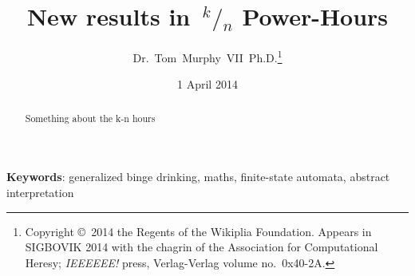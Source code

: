 \documentclass[twocolumn]{article}
\newcommand\sfrac[2]{{}\,^{#1}\!/{}\!_{#2}}
\begin{document}
 

\title{New results in $\sfrac{k}{n}$ Power-Hours}
\author{Dr.~Tom~Murphy~VII~Ph.D.\thanks{
Copyright \copyright\ 2014 the Regents of the Wikiplia
Foundation. Appears in SIGBOVIK 2014 with the chagrin of the
Association for Computational Heresy; {\em IEEEEEE!} press,
Verlag-Verlag volume no.~0x40-2A.
}
}

\renewcommand\th{\ensuremath{{}^{\textrm{th}}}}
\newcommand\st{\ensuremath{{}^{\textrm{st}}}}
\newcommand\rd{\ensuremath{{}^{\textrm{rd}}}}
\newcommand\nd{\ensuremath{{}^{\textrm{nd}}}}
\newcommand\at{\ensuremath{\scriptstyle @}}

\renewcommand\>{$>$}
\newcommand\<{$<$}
\newcommand\kn{\ensuremath{\sfrac{k}{n}\,}}

\newcommand\any{\ensuremath{\textrm{?}}}
\newcommand\nocup{\text{\sout{\ensuremath{\cup}}}}
\newcommand\fullcup{\ensuremath{\uplus}}
\newcommand\emptycup{\ensuremath{\cup}}
\newcommand\overcup{\ensuremath{\cap}}

\newcommand\nodrink{\ensuremath{\Rightarrow}}
\newcommand\drink{\ensuremath{\stackrel{{}^{\textrm{+}}}{\Rightarrow}}}
\newcommand\qdrink{\ensuremath{\stackrel{{}^{\textrm{?}}}{\Rightarrow}}}

\date{1 April 2014}

\maketitle

\begin{abstract}
Something about the k-n hours

\end{abstract}

\vspace{1em}
{\noindent \small {\bf Keywords}:
  generalized binge drinking, maths,
  finite-state automata,
  abstract interpretation
}
\end{document}
